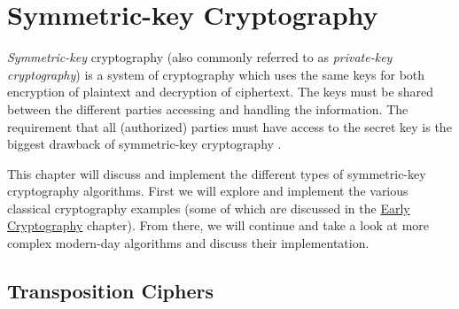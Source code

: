 \chapter{Symmetric-key Cryptography} %
\label{Symmetric-key Cryptography} %


\textit{Symmetric-key} cryptography (also commonly referred to as \textit{private-key cryptography}) is a system of cryptography which
uses the same keys for both encryption of plaintext and decryption of ciphertext. The keys must be shared between the different
parties accessing and handling the information. The requirement that all (authorized) parties must have access to the secret key
is the biggest drawback of symmetric-key cryptography \cite{wiki:symmetric_key_cryptography}.     

This chapter will discuss and implement the different types of symmetric-key cryptography algorithms. 
First we will explore and implement the various classical cryptography examples (some of which are discussed in the 
\hyperref[Early Cryptography]{Early Cryptography} chapter). From there, we will continue and take a look at more complex modern-day algorithms 
and discuss their implementation. 

\section{Transposition Ciphers}